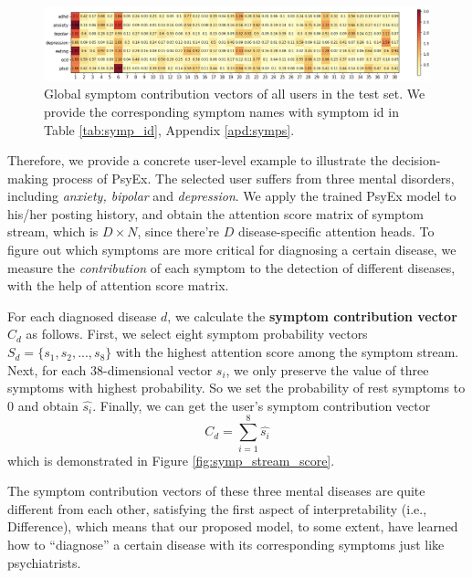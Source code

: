 \begin{figure}[th]
    \centering
    \includegraphics[width=\linewidth]{figures/symp_contributions.png}
    \caption{Global symptom contribution vectors of all users in the test set. We provide the corresponding symptom names with symptom id in Table \ref{tab:symp_id}, Appendix \ref{apd:symps}.}
    \label{fig:symp_contribution}
\end{figure}

Therefore, we provide a concrete user-level example to illustrate the decision-making process of PsyEx. The selected user suffers from three mental disorders, including \textit{anxiety, bipolar} and \textit{depression}. 
We apply the trained PsyEx model to his/her posting history, and obtain the attention score matrix of symptom stream, which is $D \times N$, since there're $D$ disease-specific attention heads. To figure out which symptoms are more critical for diagnosing a certain disease, we measure the \textit{contribution} of each symptom to the detection of different diseases, with the help of attention score matrix. 

For each diagnosed disease $d$, we calculate the \textbf{symptom contribution vector} $C_d$ as follows. 
First, we select eight symptom probability vectors $S_d = \{s_1, s_2, ..., s_{8}\}$ with the highest attention score among the symptom stream. Next, for each 38-dimensional vector $s_i$, we only preserve the value of three symptoms with highest probability. So we set the probability of rest symptoms to 0 and obtain $\hat{s_i}$. Finally, we can get the user's symptom contribution vector
\begin{equation}
    C_d = \sum_{i=1}^8 \hat{s_i}
    \label{eq:symp_contri}
\end{equation}
which is demonstrated in Figure \ref{fig:symp_stream_score}. 

The symptom contribution vectors of these three mental diseases are quite different from each other, satisfying the first aspect of interpretability (i.e., Difference), which means that our proposed model, to some extent, have learned how to ``diagnose'' a certain disease with its corresponding symptoms just like psychiatrists. 

